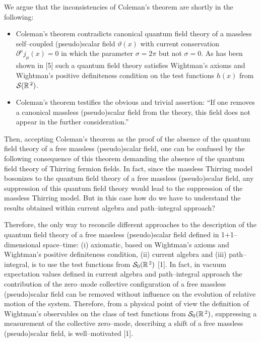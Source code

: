 \documentclass[a4paper,12pt] {article}
\begin{document}
\hspace{0.2in} We argue that the inconsistencies of Coleman's theorem
are shortly in the following:
\begin{itemize}
\item Coleman's theorem contradicts canonical quantum field theory of
a massless self--coupled (pseudo)scalar field $\vartheta(x)$ with
current conservation $\partial^{\mu}j_{\mu}(x) = 0$ in which the
parameter $\sigma = 2\pi$ but not $\sigma = 0$. As has been shown in
[5] such a quantum field theory satisfies Wightman's axioms and
Wightman's positive definiteness condition on the test functions
$h(x)$ from ${\cal S}(\mathbb{R}^{\,2})$.

\item Coleman's theorem testifies the obvious and trivial assertion:
``If one removes a canonical massless (pseudo)scalar field from the
theory, this field does not appear in the further consideration.''
\end{itemize}

Then, accepting Coleman's theorem as the proof of the absence of the
quantum field theory of a free massless (pseudo)scalar field, one can
be confused by the following consequence of this theorem demanding the
absence of the quantum field theory of Thirring fermion fields.  In
fact, since the massless Thirring model bosonizes to the quantum field
theory of a free massless (pseudo)scalar field, any suppression of
this quantum field theory would lead to the suppression of the
massless Thirring model. But in this case how do we have to understand
the results obtained within current algebra and path--integral
approach?

Therefore, the only way to reconcile different approaches to the
description of the quantum field theory of a free massless
(pseudo)scalar field defined in 1+1--dimensional space--time: (i)
axiomatic, based on Wightman's axioms and Wightman's positive
definiteness condition, (ii) current algebra and (iii) path--integral,
is to use the test functions from ${\cal S}_0(\mathbb{R}^{\,2})$ [1].
In fact, in vacuum expectation values defined in current algebra and
path--integral approach the contribution of the zero--mode collective
configuration of a free massless (pseudo)scalar field can be removed
without influence on the evolution of relative motion of the
system. Therefore, from a physical point of view the definition of
Wightman's observables on the class of test functions from ${\cal
S}_0(\mathbb{R}^{\,2})$, suppressing a measurement of the collective
zero--mode, describing a shift of a free massless (pseudo)scalar
field, is well--motivated [1].
\end{document}
